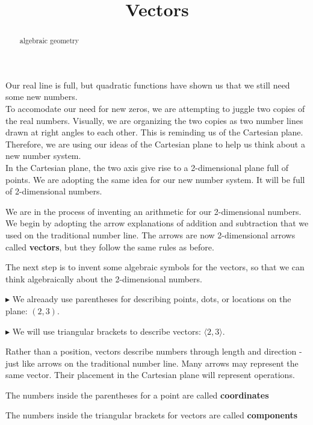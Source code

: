 \documentclass{ximera}
\title{Vectors}
\begin{document}
\begin{abstract}
algebraic geometry
\end{abstract}
\maketitle






Our real line is full, but quadratic functions have shown us that we still need some new numbers.  \\

To accomodate our need for new zeros, we are attempting to juggle two copies of the real numbers. Visually, we are organizing the two copies as two number lines drawn at right angles to each other.  This is reminding us of the Cartesian plane.  Therefore, we are using our ideas of the Cartesian plane to help us think about a new number system.  \\



In the Cartesian plane, the two axis give rise to a 2-dimensional plane full of points.  We are adopting the same idea for our new number system.  It will be full of 2-dimensional numbers.


We are in the process of inventing an arithmetic for our 2-dimensional numbers.  We begin by adopting the arrow explanations of addition and subtraction that we used on the traditional number line. The arrows are now 2-dimensional arrows called \textbf{vectors}, but they follow the same rules as before.

The next step is to invent some algebraic symbols for the vectors, so that we can think algebraically about the 2-dimensional numbers.


$\blacktriangleright$ We alreaady use parentheses for describing points, dots, or locations on the plane: $(2, 3)$.


$\blacktriangleright$ We will use triangular brackets to describe vectors: $\langle 2, 3 \rangle$.  

Rather than a position, vectors describe numbers through length and direction - just like arrows on the traditional number line. Many arrows may represent the same vector.  Their placement in the Cartesian plane will represent operations.


The numbers inside the parentheses for a point are called \textbf{\textcolor{purple!85!blue}{coordinates}}  

The numbers inside the triangular brackets for vectors are called \textbf{\textcolor{purple!85!blue}{components}}  
\end{document}
